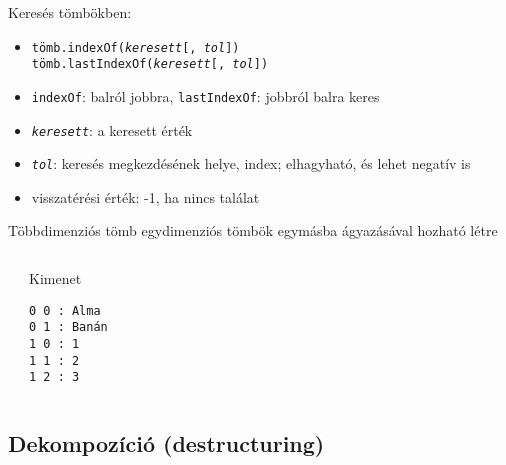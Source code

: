 \begin{frame}
  \footnotesize
  Keresés tömbökben: 
  \begin{itemize}
    \item \texttt{tömb.indexOf(\emph{keresett}[, \emph{tol}])} \\
          \texttt{tömb.lastIndexOf(\emph{keresett}[, \emph{tol}])}
    \item \texttt{indexOf}: balról jobbra, \texttt{lastIndexOf}: jobbról balra keres
    \item \texttt{\emph{keresett}}: a keresett érték
    \item \texttt{\emph{tol}}: keresés megkezdésének helye, index; elhagyható, és lehet negatív is
    \item visszatérési érték: -1, ha nincs találat
  \end{itemize}
  \scriptsize
  \begin{exampleblock}{}
    \vspace{-0.3cm}
    
    \vspace{-0.3cm}
  \end{exampleblock}
\end{frame}

\begin{frame}[fragile]
  Többdimenziós tömb egydimenziós tömbök egymásba ágyazásával hozható létre
  \vfill
  \footnotesize
  \begin{columns}[T]
      \begin{exampleblock}{}
        
      \end{exampleblock}
      \begin{block}{Kimenet}
        \begin{verbatim}
0 0 : Alma
0 1 : Banán
1 0 : 1
1 1 : 2
1 2 : 3
\end{verbatim}
      \end{block}
  \end{columns}
\end{frame}

\subsection{Dekompozíció (destructuring)}

